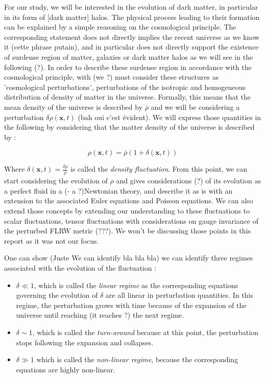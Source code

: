 For our study, we will be interested in the evolution of dark matter, in particular in its form of [dark matter] halos. The physical process leading to their formation can be explained by a simple reasoning on the cosmological principle. The corresponding statement does not directly implies the recent universe as we know it (cette phrase putain), and in particular does not directly support the existence of surdense region of matter, galaxies or dark matter halos as we will see in the following (?). In order to describe these surdense region in accordance with the cosmological principle, with (we ?) must consider these structures as 'cosmological perturbations', perturbations of the isotropic and homogeneous distribution of density of matter in the universe. Formally, this means that the mean density of the universe is described by $\bar{\rho}$ and we will be considering a perturbation $\delta \rho (\textbf{x}, t)$ (bah oui c'est évident). We will express those quantities in the following by considering that the matter density of the universe is described by :

\begin{equation}
\label{Perturbat}
\rho (\textbf{x}, t) = \bar{\rho} (1 + \delta (\textbf{x}, t) )
\end{equation}

Where $\delta (\textbf{x}, t) = \frac{\delta \rho}{\bar{\rho}}$ is called the \textit{density fluctuation}. From this point, we can start considering the evolution of $\rho$ and gives considerations (?) of its evolution as a perfect fluid in a (- a ?)Newtonian theory, and describe it as is with an extension to the associated Euler equations and Poisson equations. We can also extend those concepts by extending our understanding to these fluctuations to scalar fluctuations, tensor fluctuations with considerations on gauge invariance of the perturbed FLRW metric (???). We won't be discussing those points in this report as it was not our focus.


One can show (Juste We can identify bla bla bla) we can identify three regimes associated with the evolution of the fluctuation :
\begin{itemize}
    \item $\delta \ll 1$, which is called the \textit{linear regime} as the corresponding equations governing the evolution of $\delta$ are all linear in perturbation quantities. In this regime, the perturbation grows with time because of the expansion of the universe until reaching (it reaches ?) the next regime.
    \item $\delta \sim 1$, which is called the \textit{turn-around} because at this point, the perturbation stops following the expansion and collapses.
    \item $\delta \gg 1$ which is called the \textit{non-linear regime}, because the corresponding equations are highly non-linear.
\end{itemize}


